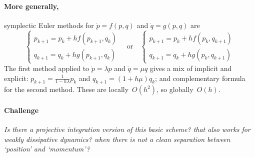 \documentclass[11pt,a5paper]{article}
\begin{document}
\paragraph{More generally,}  symplectic Euler methods for \(\dot p=f(p,q)\) and \(\dot q=g(p,q)\) are
\begin{equation*}
\begin{cases}
p_{k+1}=p_k+hf(p_{k+1},q_k)
\\q_{k+1}=q_k+hg(p_{k+1},q_k)
\end{cases}
\quad\text{or}\quad
\begin{cases}
p_{k+1}=p_k+hf(p_{k},q_{k+1})
\\q_{k+1}=q_k+hg(p_{k},q_{k+1})
\end{cases}
\end{equation*}
The first method applied to \(\dot p=\lambda p\) and \(\dot q=\mu q\) gives a mix of implicit and explicit: \(p_{k+1}=\frac1{1-h\lambda}p_k\) and \(q_{k+1}=(1+h\mu)q_k\); and complementary formula for the second method. 
These are locally~\(O(h^2)\), so globally~\(O(h)\).


\paragraph{Challenge}
\emph{Is there a projective integration version of this basic scheme?  
that also works for weakly dissipative dynamics?  
when there is not a clean separation between `position' and `momentum'?}
\end{document}

